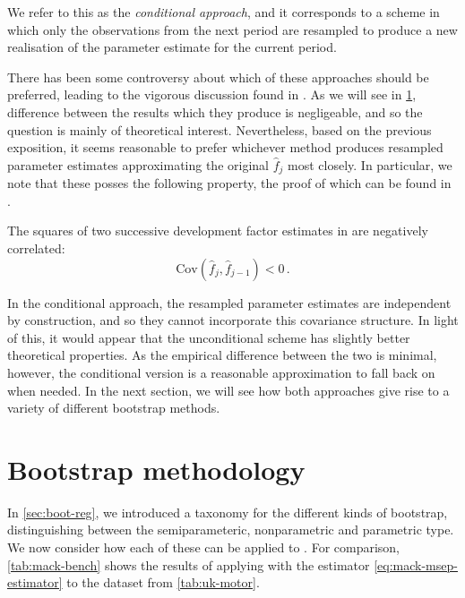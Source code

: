 \documentclass[a4paper]{book}
\begin{document}
We refer to this as the \emph{conditional approach}, and it corresponds to a scheme in which only the observations from the next period are resampled to produce a new realisation of the parameter estimate for the current period.

There has been some controversy about which of these approaches should be preferred, leading to the vigorous discussion found in \cite{wuthrich:chain-ladder-msep, mack:msep, gisler:msep, venter:msep}. As we will see in \cref{sec:mack-boot}, difference between the results which they produce is negligeable, and so the question is mainly of theoretical interest. Nevertheless, based on the previous exposition, it seems reasonable to prefer whichever method produces resampled parameter estimates approximating the original $\widehat{f}_j$ most closely. In particular, we note that these posses the following property, the proof of which can be found in \cite{mack:msep}.

\begin{theorem}
  The squares of two successive development factor estimates in  are negatively correlated:
  \begin{equation}
    \mathrm{Cov}(\widehat{f}_j, \widehat{f}_{j - 1}) < 0 \,.
  \end{equation}
\end{theorem}

\noindent In the conditional approach, the resampled parameter estimates are independent by construction, and so they cannot incorporate this covariance structure. In light of this, it would appear that the unconditional scheme has slightly better theoretical properties. As the empirical difference between the two is minimal, however, the conditional version is a reasonable approximation to fall back on when needed. In the next section, we will see how both approaches give rise to a variety of different bootstrap methods.

\section{Bootstrap methodology} \label{sec:mack-boot}

In \cref{sec:boot-reg}, we introduced a taxonomy for the different kinds of bootstrap, distinguishing between the semiparameteric, nonparametric and parametric type. We now consider how each of these can be applied to . For comparison, \cref{tab:mack-bench} shows the results of applying  with the estimator \cref{eq:mack-msep-estimator} to the dataset from \cref{tab:uk-motor}.
\end{document}
